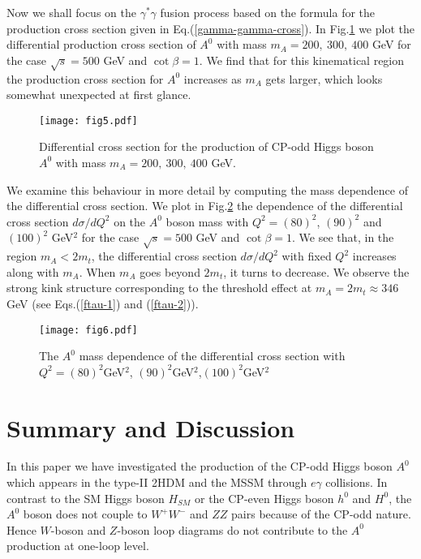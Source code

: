 \documentclass[final,5p,times,twocolumn]{elsarticle}
\begin{document}
Now we shall focus on the $\gamma^*\gamma$ fusion process based on the 
formula for the production cross section given in Eq.(\ref{gamma-gamma-cross}).
In Fig.\ref{two-photon-process-3mass} we plot the differential
production cross section of $A^0$ with mass $m_A=200,\ 300,\ 400$ GeV
for the case $\sqrt{s}=500$ GeV and $\cot\beta=1$. 
We find that for this kinematical region the production cross section for
$A^0$ increases as $m_A$ gets larger, which looks somewhat unexpected at first glance.
\begin{figure}[hbt]
\vspace*{-0.8cm}
\begin{center}
\hspace*{-1.2cm}
\texttt{[image: fig5.pdf]}
\caption{Differential cross section for the production of CP-odd Higgs boson 
$A^0$ with mass $m_A=200,\ 300,\ 400$ GeV.}
\label{two-photon-process-3mass} 
\end{center}
\end{figure}
We  examine this behaviour in more detail by computing the mass dependence of the differential
cross section. 
We plot in Fig.\ref{mass-diff-dependence}
the dependence of the differential cross section $d\sigma/dQ^2$ 
on the $A^0$ boson mass with 
$Q^2=(80)^2$, $(90)^2$ and $(100)^2$ GeV$^2$ for the case $\sqrt{s}=500$ GeV and $\cot\beta=1$. 
We see that, in the region $m_A <2m_t$, the differential cross section $d\sigma/dQ^2$ with fixed $Q^2$ increases along with $m_A$. When $m_A$ goes beyond $2m_t$, it turns to decrease. 
We observe the strong kink structure corresponding to the threshold 
effect at $m_A=2m_t\approx 346$ GeV (see Eqs.(\ref{ftau-1}) and (\ref{ftau-2})).

\begin{figure}[hbt]
\vspace*{-0.8cm}
\begin{center}
\hspace*{-1.2cm}
\texttt{[image: fig6.pdf]}
\caption{The $A^0$ mass dependence of the differential cross section with $Q^2=(80)^2$GeV$^2$, $(90)^2$GeV$^2$,$(100)^2$GeV$^2$}
\label{mass-diff-dependence} 
\end{center}
\end{figure}


\section{Summary and Discussion}
In this paper we have investigated the 
production
of the CP-odd Higgs boson $A^0$ which appears in the 
type-II 2HDM and the MSSM 
through $e\gamma$ collisions. In contrast to the SM Higgs boson 
$H_{SM}$ or 
the CP-even Higgs boson $h^0$ and $H^0$, the $A^0$ boson does not couple to 
$W^+W^-$ and $ZZ$ pairs because of the CP-odd nature. 
Hence $W$-boson and $Z$-boson loop 
diagrams do not contribute to the $A^0$ production at one-loop level.
\end{document}
